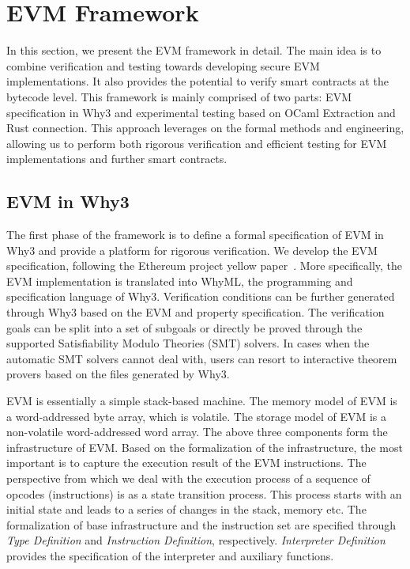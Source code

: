 \documentclass[runningheads]{llncs}
\begin{document}
\section{EVM Framework}\label{Sec: Framework}
In this section, we present the EVM framework in detail. The main idea is to combine verification and testing towards developing secure EVM implementations.
It also provides the potential to verify smart contracts at the bytecode level.  This framework is mainly comprised of two parts: EVM specification in Why3 and experimental testing based on OCaml Extraction and Rust connection. This approach leverages on the formal methods and engineering, allowing us to perform both rigorous verification and efficient testing for EVM implementations and further smart contracts. 

\subsection{EVM in Why3}
The first phase of the framework is to define a formal specification of EVM in Why3 and provide a platform for rigorous verification.  
We develop the EVM specification, following the Ethereum project yellow paper~\cite{wood2014ethereum}. More specifically, the EVM implementation is translated into WhyML, the programming and specification language of Why3. %
Verification conditions can be further generated through Why3 based on the EVM and property specification. The verification goals can be split into a set of subgoals or directly be proved through the supported Satisfiability Modulo Theories (SMT) solvers. In cases when the automatic SMT solvers cannot deal with, users can resort to interactive theorem provers based on the files generated by Why3.

EVM is essentially a simple stack-based machine. The memory model of EVM is a word-addressed byte array, which is volatile. The storage model of EVM is a non-volatile word-addressed word array. The above three components form the infrastructure of EVM. Based on the formalization of the infrastructure, the most important is to capture the execution result of the EVM instructions. The perspective from which we deal with the execution process of a sequence of opcodes (instructions) is as a state transition process. This process starts with an initial state and leads to a series of changes in the stack, memory etc. The formalization of base infrastructure and the instruction set are specified through \textit{Type Definition} and \textit{Instruction Definition}, respectively. \textit{Interpreter Definition} provides the specification of the interpreter and auxiliary functions. 
\end{document}
